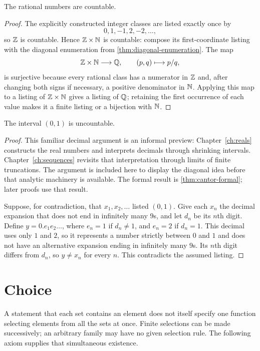\begin{corollary}\label{cor:rationals-countable}
The rational numbers are countable.
\end{corollary}
\begin{proof}
The explicitly constructed integer classes are listed exactly once by
\[
0,1,-1,2,-2,\ldots,
\]
so \(\mathbb{Z}\) is countable. Hence \(\mathbb{Z}\times\mathbb{N}\) is countable: compose its
first-coordinate listing with the diagonal enumeration from
\cref{thm:diagonal-enumeration}. The map
\[
\mathbb{Z}\times\mathbb{N}\longrightarrow\mathbb{Q},\qquad(p,q)\longmapsto p/q,
\]
is surjective because every rational class has a numerator in \(\mathbb{Z}\) and,
after changing both signs if necessary, a positive denominator in \(\mathbb{N}\).
Applying this map to a listing of \(\mathbb{Z}\times\mathbb{N}\) gives a listing of \(\mathbb{Q}\);
retaining the first occurrence of each value makes it a finite listing or a
bijection with \(\mathbb{N}\).
\end{proof}

\begin{theorem}
\label{thm:cantor-diagonal}
The interval $(0,1)$ is uncountable.
\end{theorem}
\begin{proof}
This familiar decimal argument is an informal preview: Chapter~\ref{ch:reals}
constructs the real numbers and interprets decimals through shrinking
intervals. Chapter~\ref{ch:sequences} revisits that interpretation through
limits of finite truncations. The argument is included here
to display the diagonal idea before that analytic machinery is available.
The formal result is \cref{thm:cantor-formal}; later proofs use that result.

Suppose, for contradiction, that $x_1,x_2,\ldots$ listed $(0,1)$. Give each $x_n$ the decimal expansion that does not end in infinitely many $9$s, and let $d_n$ be its $n$th digit. Define $y=0.e_1e_2\ldots$, where $e_n=1$ if $d_n\ne1$, and $e_n=2$ if $d_n=1$. This decimal uses only $1$ and $2$, so it represents a number strictly between $0$ and $1$ and does not have an alternative expansion ending in infinitely many $9$s. Its $n$th digit differs from $d_n$, so $y\ne x_n$ for every $n$. This contradicts the assumed listing.
\end{proof}

\section{Choice}

A statement that each set contains an element does not itself specify
one function selecting elements from all the sets at once. Finite selections
can be made successively; an arbitrary family may have no given selection
rule. The following axiom supplies that simultaneous existence.


